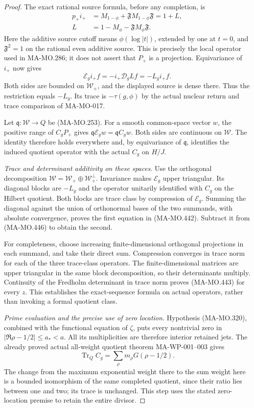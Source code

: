 \begin{proof}
The exact rational source formula, before any completion, is
\[
 \begin{aligned}
 p_+i_+&=M_{1-\phi}+\mathfrak F M_{1-\phi}\mathfrak F
        =1+L,\\
 L&=1-M_\phi-\mathfrak F M_\phi\mathfrak F.
 \end{aligned}
 \tag{MA-MO.447}
\]
Here the additive source cutoff means
\(\phi(\log|t|)\), extended by one at \(t=0\), and
\(\mathfrak F^2=1\) on the rational even additive
source. This is precisely the local operator used in
MA-MO.286; it does not assert that \(P_+\) is a projection.
Equivariance of \(i_+\) now gives
\[
 \mathscr E_gi_+f=-i_+\mathcal D_gLf=-L_gi_+f.
 \tag{MA-MO.448}
\]
Both sides are bounded on \(\mathcal W_+\), and the
displayed source is dense there. Thus the restriction equals
\(-L_g\). Its trace is \(-\tau(g,\phi)\) by the actual
nuclear return and trace comparison of MA-MO-017.

Let \(\mathfrak q:\mathcal W\to Q\) be (MA-MO.253).
For a smooth common-space vector \(w\), the positive range
of \(C_gP_+\) gives
\(\mathfrak q\mathscr E_gw=\mathfrak q C_gw\).
Both sides are continuous on \(\mathcal W\). The identity
therefore holds everywhere and, by equivariance of
\(\mathfrak q\), identifies the induced quotient operator
with the actual \(C_g\) on \(H/J\).

\emph{Trace and determinant additivity on these spaces.}
Use the orthogonal decomposition
\(\mathcal W=\mathcal W_+\oplus\mathcal W_+^\perp\).
Invariance makes \(\mathscr E_g\) upper triangular.
Its diagonal blocks are \(-L_g\) and the operator unitarily
identified with \(C_g\) on the Hilbert quotient. Both blocks
are trace class by compression of \(\mathscr E_g\).
Summing the diagonal against the union of orthonormal bases
of the two summands, with absolute convergence, proves the
first equation in (MA-MO.442). Subtract it from (MA-MO.446)
to obtain the second.

For completeness, choose increasing finite-dimensional
orthogonal projections in each summand, and take their direct
sum. Compression converges in trace norm for each of the
three trace-class operators. The finite-dimensional matrices
are upper triangular in the same block decomposition, so
their determinants multiply. Continuity of the Fredholm
determinant in trace norm proves (MA-MO.443) for every \(z\).
This establishes the exact-sequence formula on actual
operators, rather than invoking a formal quotient class.

\emph{Prime evaluation and the precise use of zero location.}
Hypothesis (MA-MO.320), combined with the functional equation
of \(\zeta\), puts every nontrivial zero in
\(|\Re\rho-1/2|\le a_*<a\). All its multiplicities are
therefore interior retained jets. The already proved actual
all-weight quotient theorem MA-WP-001--003 gives
\[
 \operatorname{Tr}_Q C_g
    =\sum_\rho m_\rho G(\rho-1/2).
 \tag{MA-MO.449}
\]
The change from the maximum exponential weight there to the
sum weight here is a bounded isomorphism of the same
completed quotient, since their ratio lies between one and
two; its trace is unchanged. This step uses the stated
zero-location premise to retain the entire divisor.


\end{proof}
